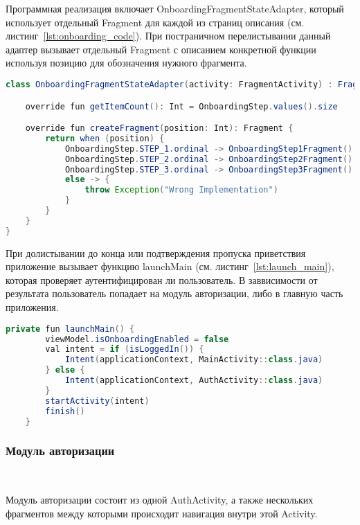 Программная реализация включает OnboardingFragmentStateAdapter, который использует отдельный Fragment для каждой из страниц описания (см. листинг~\ref{lst:onboarding_code}). При постраничном перелистывании данный адаптер вызывает отдельный Fragment с описанием конкретной функции используя позицию для обозначения нужного фрагмента.


\begin{lstlisting}[language=Java,label={lst:onboarding_code},caption={OnboardingFragmentStateAdapter}]
class OnboardingFragmentStateAdapter(activity: FragmentActivity) : FragmentStateAdapter(activity) {

    override fun getItemCount(): Int = OnboardingStep.values().size

    override fun createFragment(position: Int): Fragment {
        return when (position) {
            OnboardingStep.STEP_1.ordinal -> OnboardingStep1Fragment()
            OnboardingStep.STEP_2.ordinal -> OnboardingStep2Fragment()
            OnboardingStep.STEP_3.ordinal -> OnboardingStep3Fragment()
            else -> {
                throw Exception("Wrong Implementation")
            }
        }
    }
}
\end{lstlisting}


При долистывании до конца или подтверждения пропуска приветствия приложение вызывает функцию launchMain (см. листинг~\ref{lst:launch_main}), которая проверяет аутентифицирован ли пользователь. В заввисимости от результата пользователь попадает на модуль авторизации, либо в главную часть приложения.

\begin{lstlisting}[language=Java,label={lst:launch_main},caption={Функция launchMain}]
    private fun launchMain() {
        viewModel.isOnboardingEnabled = false
        val intent = if (isLoggedIn()) {
            Intent(applicationContext, MainActivity::class.java)
        } else {
            Intent(applicationContext, AuthActivity::class.java)
        }
        startActivity(intent)
        finish()
    }
\end{lstlisting}


\subsubsection{Модуль авторизации}~\par

Модуль авторизации состоит из одной AuthActivity, а также нескольких фрагментов между которыми происходит навигация внутри этой Activity.

